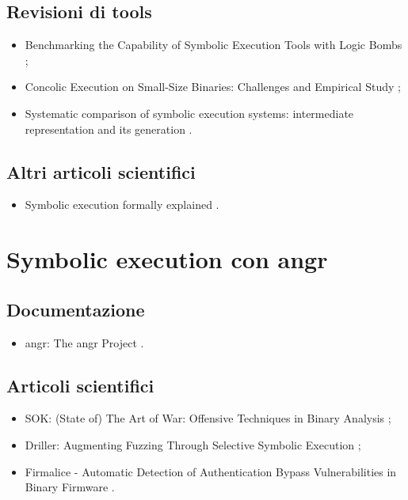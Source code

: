 \subsection*{Revisioni di tools}
\begin{itemize}

\item Benchmarking the Capability of Symbolic Execution Tools with Logic Bombs \cite{xu2020symbexetools};

\item Concolic Execution on Small-Size Binaries: Challenges and Empirical Study \cite{xu2017symbexetools};

\item Systematic comparison of symbolic execution systems: intermediate representation and its generation \cite{poeplau2019symbexetools}.

\end{itemize}

\subsection*{Altri articoli scientifici}
\begin{itemize}

\item Symbolic execution formally explained \cite{boer2021symbexe}.

\end{itemize}

\section*{Symbolic execution con angr}

\subsection*{Documentazione}
\begin{itemize}

\item angr: The angr Project \cite{angr9.2.90doc}.

\end{itemize}

\subsection*{Articoli scientifici}
\begin{itemize}

\item SOK: (State of) The Art of War: Offensive Techniques in Binary Analysis \cite{shoshitaishvili2016angr};

\item Driller: Augmenting Fuzzing Through Selective Symbolic Execution \cite{stephens2016driller};

\item Firmalice - Automatic Detection of Authentication Bypass Vulnerabilities in Binary Firmware \cite{shoshitaishvili2015firmlice}.

\end{itemize}

